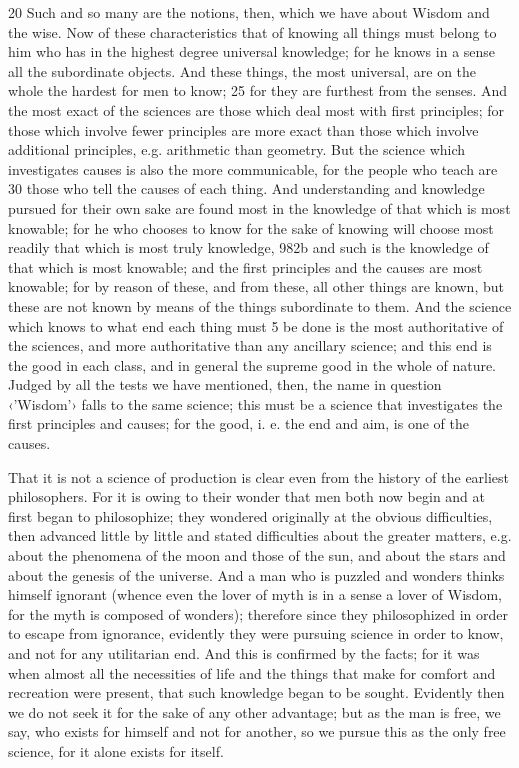 20 Such and so many are the notions, then, which we have about Wisdom and the wise. Now of these characteristics that of knowing all things must belong to him who has in the highest degree universal knowledge; for he knows in a sense all the subordinate objects. And these things, the most universal, are on the whole the hardest for men to know; 25 for they are furthest from the senses. And the most exact of the sciences are those which deal most with first principles; for those which involve fewer principles are more exact than those which involve additional principles, e.g. arithmetic than geometry. But the science which investigates causes is also the more communicable, for the people who teach are 30 those who tell the causes of each thing. And understanding and knowledge pursued for their own sake are found most in the knowledge of that which is most knowable; for he who chooses to know for the sake of knowing will choose most readily that which is most truly knowledge, 982b and such is the knowledge of that which is most knowable; and the first principles and the causes are most knowable; for by reason of these, and from these, all other things are known, but these are not known by means of the things subordinate to them. And the science which knows to what end each thing must 5 be done is the most authoritative of the sciences, and more authoritative than any ancillary science; and this end is the good in each class, and in general the supreme good in the whole of nature. Judged by all the tests we have mentioned, then, the name in question ‹'Wisdom'› falls to the same science; this must be a science that investigates the first principles and causes; for the good, i. e. the end and aim, is one of the causes.

That it is not a science of production is clear even from the history of the earliest philosophers. For it is owing to their wonder that men both now begin and at first began to philosophize; they wondered originally at the obvious difficulties, then advanced little by little and stated difficulties about the greater matters, e.g. about the phenomena of the moon and those of the sun, and about the stars and about the genesis of the universe. And a man who is puzzled and wonders thinks himself ignorant (whence even the lover of myth is in a sense a lover of Wisdom, for the myth is composed of wonders); therefore since they philosophized in order to escape from ignorance, evidently they were pursuing science in order to know, and not for any utilitarian end. And this is confirmed by the facts; for it was when almost all the necessities of life and the things that make for comfort and recreation were present, that such knowledge began to be sought. Evidently then we do not seek it for the sake of any other advantage; but as the man is free, we say, who exists for himself and not for another, so we pursue this as the only free science, for it alone exists for itself.

